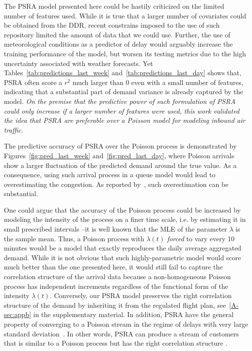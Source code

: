 \documentclass[draft,review]{elsarticle}
\makeatletter
\newcommand*{\ie}{i.e.\@\xspace}
\makeatother
\begin{document}
  The \ac{PSRA} model presented here could be hastily criticized on the limited number of features used.
  While it is true that a larger number of covariates could be obtained from the \ac{DDR}, recent constrains imposed to the use of such repository limited the amount of data that we could use.
  Further, the use of meteorological conditions as a predictor of delay would arguably increase the training performance of the model, but worsen its testing metrics due to the high uncertainty associated with weather forecasts.
  Yet Tables~\ref{tab:predictions_last_week} and~\ref{tab:predictions_last_day} shows that, \ac{PSRA} often score a \(r^2\) much larger than 0 even with a small number of features, indicating that a substantial part of demand variance is already captured by the model.
  \emph{On the premise that the predictive power of such formulation of \ac{PSRA} could only increase if a larger number of features were used, this work validated the idea that \ac{PSRA} are preferable over a Poisson model for modeling inbound air traffic.}

  The predictive accuracy of \ac{PSRA} over the Poisson process is demonstrated by Figures~\ref{fig:pred_last_week} and~\ref{fig:pred_last_day}, where Poisson arrivals show a larger fluctuation of the predicted demand around the true value.
  As a consequence, using such arrival process in a queue model would lead to overestimating the congestion.
  As reported by~\citet{caccavale2014model}, such overestimation can be substantial.

  One could argue that the accuracy of the Poisson process could be increased by modeling the intensity of the process on a finer time scale, \ie{} by estimating it in small prescribed intervals --it is well known that the \ac{MLE} of the parameter \(\lambda\) is the sample mean.
  Thus, a Poisson process with \(\lambda(t)\) \emph{forced} to vary every 10 minutes would be a model that exactly reproduces the daily average aggregated demand.
  While it is not obvious that such highly-parametric model would score much better than the one presented here, it would still fail to capture the correlation structure of the arrival data because a non-homogeneous Poisson process has independent increments regardless of the functional form of the intensity \(\lambda(t)\).
  Conversely, our \ac{PSRA} model preserves the right correlation structure of the demand by inheriting it from the regulated flight plan, see~\ref{A-sec:appb} in the supplementary material.
  In addition, \ac{PSRA} have the general property of converging to a Poisson stream in the regime of delays with very large standard deviation~\citep{guadagni2011queueing}. In other words, PSRA can produce a stream of customers that is similar to a Poisson process but has the right correlation structure .
\end{document}
